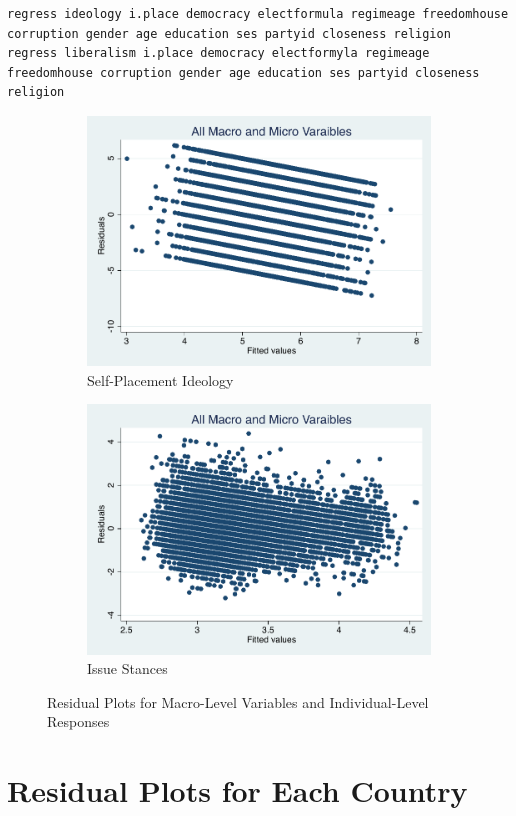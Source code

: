 \documentclass[12pt, titlepage]{article}
\begin{document}
\begin{verbatim}
regress ideology i.place democracy electformula regimeage freedomhouse corruption gender age education ses partyid closeness religion
regress liberalism i.place democracy electformyla regimeage freedomhouse corruption gender age education ses partyid closeness religion
\end{verbatim}

\begin{figure}[H]
	\centering
	\begin{subfigure}[b]{0.475\textwidth}   
		\centering 
		\includegraphics[width=\textwidth]{Residuals/Macroresid}
		\caption{Self-Placement Ideology}
	\end{subfigure}
	\hfill
	\begin{subfigure}[b]{0.475\textwidth}
		\centering 
		\includegraphics[width=\textwidth]{Residuals/Macroresidlib}
		\caption{Issue Stances}
	\end{subfigure}
	\caption{Residual Plots for Macro-Level Variables and Individual-Level Responses}
	\label{AllMacroRVF}
\end{figure}


\section{Residual Plots for Each Country}
\end{document}
